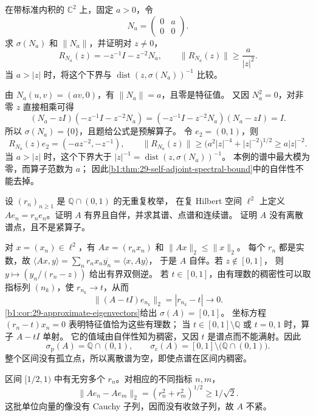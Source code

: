\BookExercises

\begin{optionalexercise}\label{b1:ex:29-nilpotent-resolvent}
在带标准内积的 \(\mathbb C^2\) 上，固定 \(a>0\)，令
\[
 N_a=\begin{pmatrix}0&a\\0&0\end{pmatrix}.
\]
求 \(\sigma(N_a)\) 和 \(\|N_a\|\)，并证明对 \(z\ne0\)，
\[
 R_{N_a}(z)=-z^{-1}I-z^{-2}N_a,\qquad
 \|R_{N_a}(z)\|\geq\frac a{|z|^2}.
\]
当 \(a>|z|\) 时，将这个下界与 \(\operatorname{dist}(z,\sigma(N_a))^{-1}\) 比较。
\end{optionalexercise}
\begin{solution}
由 \(N_a(u,v)=(av,0)\)，有 \(\|N_a\|=a\)，且零是特征值。
又因 \(N_a^2=0\)，对非零 \(z\) 直接相乘可得
\[
 (N_a-zI)(-z^{-1}I-z^{-2}N_a)
 =(-z^{-1}I-z^{-2}N_a)(N_a-zI)=I.
\]
所以 \(\sigma(N_a)=\{0\}\)，且题给公式是预解算子。
令 \(e_2=(0,1)\)，则
\[
 R_{N_a}(z)e_2=(-az^{-2},-z^{-1}),\qquad
 \|R_{N_a}(z)\|\geq\bigl(a^2|z|^{-4}+|z|^{-2}\bigr)^{1/2}
 \geq a|z|^{-2}.
\]
当 \(a>|z|\) 时，这个下界大于 \(|z|^{-1}
=\operatorname{dist}(z,\sigma(N_a))^{-1}\)。
本例的谱中最大模为零，而算子范数为 \(a\)；
因此\cref{b1:thm:29-self-adjoint-spectral-bound}中的自伴性不能去掉。
\end{solution}

\begin{optionalexercise}\label{b1:ex:29-dense-diagonal-spectrum}
设 \((r_n)_{n\geq1}\) 是 \(\mathbb Q\cap(0,1)\) 的无重复枚举，
在复 Hilbert 空间 \(\ell^2\) 上定义 \(Ae_n=r_ne_n\)。证明 \(A\) 有界且自伴，并求其谱、点谱和连续谱。
证明 \(A\) 没有离散谱点，且不是紧算子。
\end{optionalexercise}
\begin{solution}
对 \(x=(x_n)\in\ell^2\)，有 \(Ax=(r_nx_n)\) 和 \(\|Ax\|_2\leq\|x\|_2\)。
每个 \(r_n\) 都是实数，故
\(\langle Ax,y\rangle=\sum_n r_nx_n\overline{y_n}=\langle x,Ay\rangle\)，
于是 \(A\) 自伴。若 \(z\notin[0,1]\)，
则 \(y\mapsto(y_n/(r_n-z))\) 给出有界双侧逆。
若 \(t\in[0,1]\)，由有理数的稠密性可以取指标列 \((n_k)\)，使 \(r_{n_k}\to t\)，从而
\[
 \|(A-tI)e_{n_k}\|_2=|r_{n_k}-t|\longrightarrow0.
\]
\cref{b1:cor:29-approximate-eigenvectors}给出 \(\sigma(A)=[0,1]\)。
坐标方程 \((r_n-t)x_n=0\) 表明特征值恰为这些有理数；
当 \(t\in[0,1]\setminus\mathbb Q\) 或 \(t=0,1\) 时，算子 \(A-tI\) 单射。
它的值域由自伴性知为稠密，又因 \(t\) 是谱点而不能满射。因此
\[
 \sigma_{\mathrm p}(A)=\mathbb Q\cap(0,1),\qquad
 \sigma_{\mathrm c}(A)=[0,1]\setminus\bigl(\mathbb Q\cap(0,1)\bigr).
\]
整个区间没有孤立点，所以离散谱为空，即使点谱在区间内稠密。

区间 \([1/2,1)\) 中有无穷多个 \(r_n\)。对相应的不同指标 \(n,m\)，
\[
 \|Ae_n-Ae_m\|_2=(r_n^2+r_m^2)^{1/2}\geq1/\sqrt2.
\]
这批单位向量的像没有 Cauchy 子列，因而没有收敛子列，故 \(A\) 不紧。
\end{solution}

